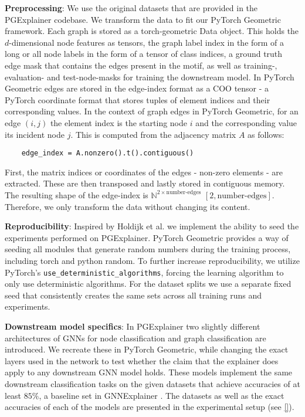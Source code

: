 \textbf{Preprocessing}: We use the original datasets that are provided in the PGExplainer codebase. We transform the data to fit our PyTorch Geometric framework. Each graph is stored as a torch-geometric Data object. This holds the $d$-dimensional node features as tensors, the graph label index in the form of a long or all node labels in the form of a tensor of class indices, a ground truth edge mask that contains the edges present in the motif, as well as training-, evaluation- and test-node-masks for training the downstream model. In PyTorch Geometric edges are stored in the edge-index format as a COO tensor - a PyTorch coordinate format that stores tuples of element indices and their corresponding values. In the context of graph edges in PyTorch Geometric, for an edge $(i,j)$ the element index is the starting node $i$ and the corresponding value its incident node $j$. This is computed from the adjacency matrix $A$ as follows:
\begin{verbatim}
    edge_index = A.nonzero().t().contiguous()
\end{verbatim}
First, the matrix indices or coordinates of the edges - non-zero elements - are extracted. These are then transposed and lastly stored in contiguous memory. The resulting shape of the edge-index is $\mathbb{N}^{2\times \text{number-edges}}$ $[2, \text{number-edges}]$. Therefore, we only transform the data without changing its content. \bigskip

\textbf{Reproducibility}: Inspired by Holdijk et al. \cite{holdijk2021re} we implement the ability to seed the experiments performed on PGExplainer. PyTorch Geometric provides a way of seeding all modules that generate random numbers during the training process, including torch and python random.
To further increase reproducibility, we utilize PyTorch's \verb|use_deterministic_algorithms|, forcing the learning algorithm to only use deterministic algorithms. For the dataset splits we use a separate fixed seed that consistently creates the same sets across all training runs and experiments.\bigskip

\textbf{Downstream model specifics}: In PGExplainer two slightly different architectures of GNNs for node classification and graph classification are introduced. We recreate these in PyTorch Geometric, while changing the exact layers used in the network to test whether the claim that the explainer does apply to any downstream GNN model holds. These models implement the same downstream classification tasks on the given datasets that achieve accuracies of at least $85\%$, a baseline set in GNNExplainer \cite{}. The datasets as well as the exact accuracies of each of the models are presented in the experimental setup (see \ref{}). 

